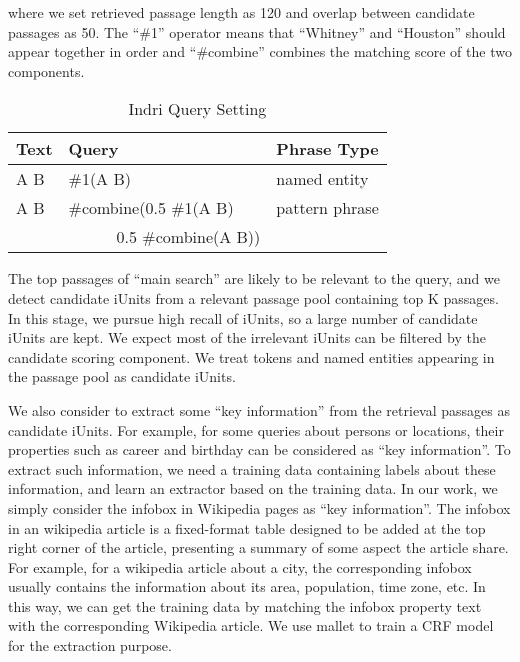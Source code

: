 \noindent where we set retrieved passage length as 120 and overlap between candidate passages as 50. The ``\#1'' operator means that ``Whitney'' and ``Houston'' should appear together in order and ``\#combine'' combines the matching score of the two components.

\begin{table}
\caption{Indri Query Setting}
\label{table:query}

\centering
\begin{tabular}{|l|l|l|}
\hline
\bf{Text} & \bf{Query} & \bf{Phrase Type} \\
\hline
\hline
A B & \#1(A B) & named entity \\
\hline
A B & \#combine(0.5 \#1(A B)  & pattern phrase \\
    & \ \ \ \ \ \ 0.5 \#combine(A B))     &  \\
\hline

\end{tabular}

\end{table}



The top passages of ``main search''  are likely to be relevant to the query, and we detect candidate iUnits from a relevant passage pool containing top K passages.
In this stage, we pursue high recall of iUnits, so a large number of candidate iUnits are kept.
We expect most of the irrelevant iUnits can be filtered by the candidate scoring component.
We treat tokens and named entities appearing in the passage pool as candidate iUnits.


We also consider to extract some ``key information'' from the retrieval passages as candidate iUnits.
For example, for some queries about persons or locations, their properties such as career and birthday can be considered as ``key information''.
To extract such information, we need a training data containing labels about these information, and learn an extractor based on the training data.
In our work, we simply consider the infobox in Wikipedia pages as ``key information''. The infobox in an wikipedia article is a fixed-format table designed to be added at the top right corner of the article, presenting a summary of some aspect the article share. For example, for a wikipedia article about a city, the corresponding infobox usually contains the information about its area, population, time zone, etc. 
In this way, we can get the training data by matching the infobox property text with the corresponding Wikipedia article.
We use mallet \cite{mccallum_02} to train a CRF model \cite{Lafferty_etal_ICML01} for the extraction purpose.
